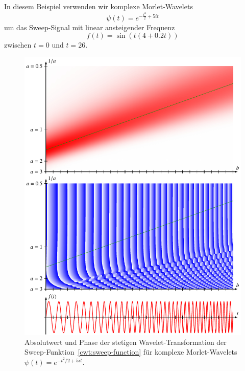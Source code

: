 \begin{beispiel}
In diesem Beispiel verwenden wir komplexe Morlet-Wavelets
\begin{equation}
\psi(t) = e^{-\frac{t^2}2 +5it} \label{cwt:morlet}
\end{equation}
um das Sweep-Signal mit linear ansteigender Frequenz
\begin{equation}
f(t)
=
\sin(t(4+0.2t))
\label{cwt:sweep-function}
\end{equation}
zwischen $t=0$ und $t=26$.
\begin{figure}
\centering
\includegraphics[width=\hsize]{chapters/4-cwt/images/sweep2.pdf}
\caption{Absolutwert und Phase der stetigen Wavelet-Transformation
der Sweep-Funktion~\eqref{cwt:sweep-function} 
für komplexe Morlet-Wavelets $\psi(t) = e^{-t^2/2+5it}$.
\label{cwt:sweep-cwt-abs-phase}}
\end{figure}
\begin{figure}
\centering

\end{figure}
\end{beispiel}
